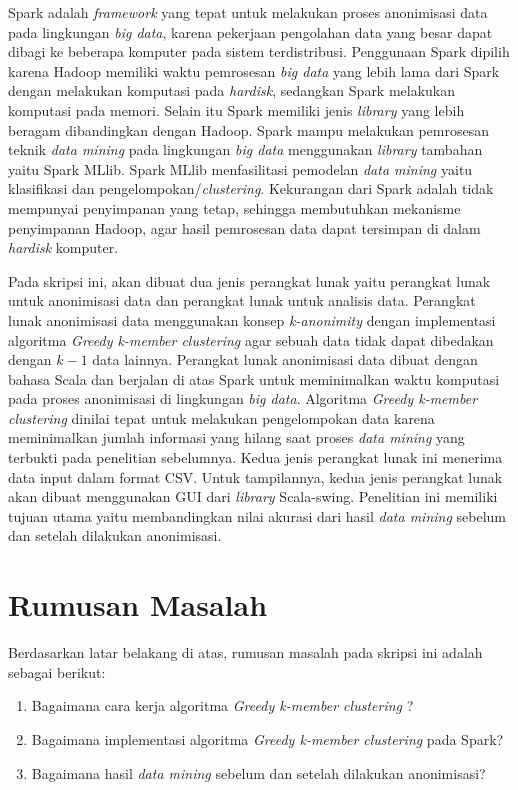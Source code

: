 \documentclass[a4paper,twoside]{article}
\begin{document}
Spark adalah {\it framework} yang tepat untuk melakukan proses anonimisasi data pada lingkungan \textit{big data}, karena pekerjaan pengolahan data yang besar dapat dibagi ke beberapa komputer pada sistem terdistribusi. Penggunaan Spark dipilih karena Hadoop memiliki waktu pemrosesan \textit{big data} yang lebih lama dari Spark dengan melakukan komputasi pada \textit{hardisk}, sedangkan Spark melakukan komputasi pada memori. Selain itu Spark memiliki jenis \textit{library} yang lebih beragam dibandingkan dengan Hadoop. Spark  mampu melakukan pemrosesan teknik {\it data mining} pada lingkungan \textit{big data} menggunakan {\it library} tambahan yaitu Spark MLlib. Spark MLlib menfasilitasi pemodelan \textit{data mining} yaitu klasifikasi dan pengelompokan/\textit{clustering}. Kekurangan dari Spark adalah tidak mempunyai penyimpanan yang tetap, sehingga membutuhkan  mekanisme penyimpanan Hadoop, agar hasil pemrosesan data dapat tersimpan di dalam {\it hardisk} komputer.

Pada skripsi ini, akan dibuat dua jenis perangkat lunak yaitu perangkat lunak untuk anonimisasi data dan perangkat lunak untuk analisis data. Perangkat lunak anonimisasi data menggunakan konsep {\it k-anonimity} dengan implementasi algoritma \textit{Greedy k-member clustering} agar sebuah data tidak dapat dibedakan dengan $k-1$ data lainnya. Perangkat lunak anonimisasi data dibuat dengan bahasa Scala dan berjalan di atas Spark untuk meminimalkan waktu komputasi pada proses anonimisasi di lingkungan {\it big data}. Algoritma {\it Greedy k-member clustering} dinilai tepat untuk melakukan pengelompokan data karena meminimalkan jumlah informasi yang hilang saat proses {\it data mining} yang terbukti pada penelitian sebelumnya. Kedua jenis perangkat lunak ini menerima data input dalam format CSV. Untuk tampilannya, kedua jenis perangkat lunak akan dibuat menggunakan GUI dari \textit{library} Scala-swing. Penelitian ini memiliki tujuan utama yaitu membandingkan nilai akurasi dari hasil {\it data mining} sebelum dan setelah dilakukan anonimisasi.

\section{Rumusan Masalah}
Berdasarkan latar belakang di atas, rumusan masalah pada skripsi ini adalah sebagai berikut:
\begin{enumerate}
\item Bagaimana cara kerja algoritma {\it Greedy k-member clustering} ?
\item Bagaimana implementasi algoritma {\it Greedy k-member clustering} pada Spark?
\item Bagaimana hasil {\it data mining} sebelum dan setelah dilakukan anonimisasi?
\end{enumerate}
\end{document}
